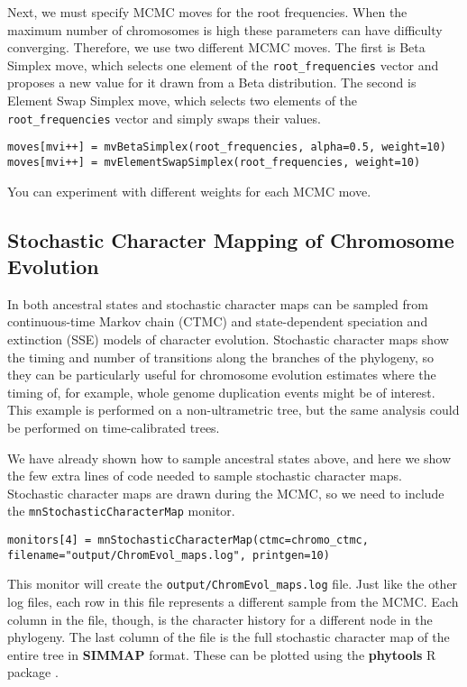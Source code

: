 Next, we must specify MCMC moves for the root frequencies.
When the maximum number of chromosomes is high these parameters
can have difficulty converging.
Therefore, we use two different MCMC moves. The first is Beta Simplex move, which selects one
element of the \texttt{root\_frequencies} vector and proposes
a new value for it drawn from a Beta distribution.
The second is Element Swap Simplex move, which selects two elements
of the \texttt{root\_frequencies} vector and simply swaps their values.
{\tt \begin{snugshade*}
\begin{lstlisting}
moves[mvi++] = mvBetaSimplex(root_frequencies, alpha=0.5, weight=10)
moves[mvi++] = mvElementSwapSimplex(root_frequencies, weight=10)
\end{lstlisting}
\end{snugshade*}}
You can experiment with different weights for each MCMC move.


\medskip
\subsection{Stochastic Character Mapping of Chromosome Evolution}\label{subsub:joint_estimation}

In \RevBayes both ancestral states and stochastic character maps can be sampled from
continuous-time Markov chain (CTMC) and state-dependent speciation and
extinction (SSE) models of character evolution.
Stochastic character maps show the timing and number of transitions
along the branches of the phylogeny, so they can be particularly useful
for chromosome evolution estimates where the timing of, for example, whole genome duplication events
might be of interest. This example is performed on a non-ultrametric tree, but
the same analysis could be performed on time-calibrated trees.


We have already shown how to sample ancestral states above, and here we show
the few extra lines of \Rev code needed to sample stochastic character maps.
Stochastic character maps are drawn during the MCMC, so we need to include the
\texttt{mnStochasticCharacterMap} monitor.
{\tt \begin{snugshade*}
\begin{lstlisting}
monitors[4] = mnStochasticCharacterMap(ctmc=chromo_ctmc, filename="output/ChromEvol_maps.log", printgen=10)
\end{lstlisting}
\end{snugshade*}}
This monitor will create the \texttt{output/ChromEvol\_maps.log} file.
Just like the other log files, each row in this file represents a different sample from the MCMC.
Each column in the file, though, is the character history for a different node in the phylogeny.
The last column of the file is the full stochastic character map of the entire tree
in \textbf{SIMMAP} \citep{bollback2006simmap} format.
These can be plotted using the \textbf{phytools} R package \citep{revell2012phytools}.

